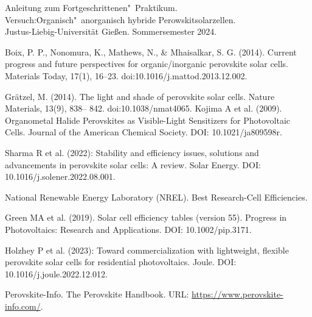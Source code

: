\documentclass[12pt,a4paper,ngerman]{report}
\begin{document}
\begin{thebibliography}{111}%
	Anleitung zum Fortgeschrittenen"~Praktikum.\\ \glqq Versuch:\.Organisch"~anorganisch hybride Perowskitsolarzellen\grqq.\\ Justus-Liebig-Universität Gießen. Sommersemester 2024.
	
	Boix, P. P., Nonomura, K., Mathews, N., \& Mhaisalkar, S. G. (2014). Current progress and future perspectives for organic/inorganic perovskite solar cells. Materials Today, 17(1), 16–23. doi:10.1016/j.mattod.2013.12.002.

	Grätzel, M. (2014). The light and shade of perovskite solar cells. Nature Materials, 13(9), 838– 842. doi:10.1038/nmat4065.
	Kojima A et al. (2009). Organometal Halide Perovskites as Visible-Light Sensitizers for Photovoltaic Cells.
	Journal of the American Chemical Society. DOI: 10.1021/ja809598r.
	
	Sharma R et al. (2022): Stability and efficiency issues, solutions and advancements in perovskite solar cells: A review. Solar Energy. DOI: 10.1016/j.solener.2022.08.001.

	National Renewable Energy Laboratory (NREL). Best Research-Cell Efficiencies.

	Green MA et al. (2019). Solar cell efficiency tables (version 55). Progress in Photovoltaics: Research and Applications. DOI: 10.1002/pip.3171.

	Holzhey P et al. (2023): Toward commercialization with lightweight, flexible perovskite solar cells for residential photovoltaics. Joule. DOI: 10.1016/j.joule.2022.12.012.

	Perovskite-Info. The Perovskite Handbook. URL: \url{https://www.perovskite-info.com/}.
	
	\end{thebibliography}


\end{document}
